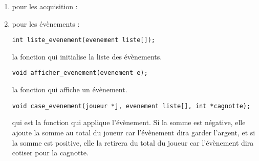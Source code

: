 \documentclass[a4paper, 11pt]{report}
\begin{document}
\begin{enumerate}
\item pour les acquisition :










\item pour les évènements :
\begin{verbatim}
int liste_evenement(evenement liste[]);
\end{verbatim}
la fonction qui initialise la liste des évènements.
\begin{verbatim}
void afficher_evenement(evenement e);
\end{verbatim}
la fonction qui affiche un évènement.
\begin{verbatim}
void case_evenement(joueur *j, evenement liste[], int *cagnotte);
\end{verbatim}
qui est la fonction qui applique l'évènement. Si la somme est négative, elle ajoute la somme au total du joueur car l'évènement dira garder l'argent, et si la somme est positive, elle la retirera du total du joueur car l'évènement dira cotiser pour la cagnotte.
\end{enumerate}
\end{document}
